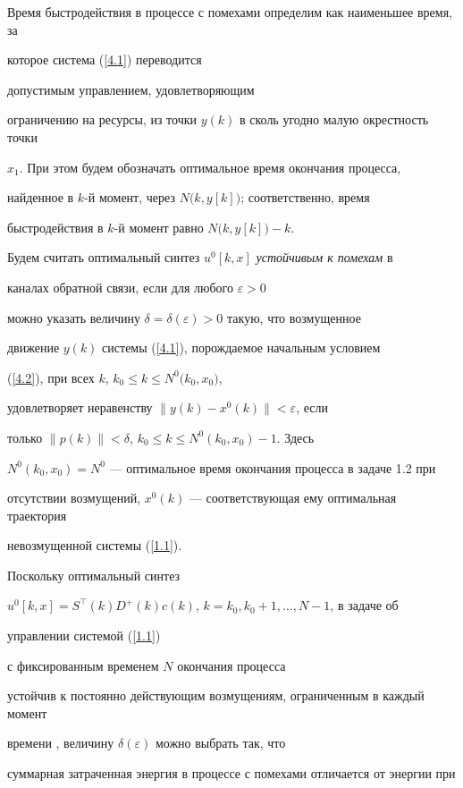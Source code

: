Время быстродействия в процессе с помехами определим как наименьшее время, за


которое система (\ref{4.1}) переводится 


допустимым управлением, удовлетворяющим


ограничению на ресурсы, из точки $y(k)$ в сколь угодно малую окрестность точки


$x_1$. При этом будем обозначать оптимальное время окончания процесса,


найденное в $k$-й момент, через $N\bigl(k, y[k]\bigr)$; соответственно, время


быстродействия в $k$-й момент равно $N\bigl(k, y[k]\bigr)-k$.





Будем считать оптимальный синтез $u^0[k, x]$ {\it устойчивым к помехам} в


каналах обратной связи, если для любого $ \varepsilon>0$


можно указать величину $\delta=\delta(\varepsilon)>0$ такую, что возмущенное


движение $y(k)$ системы (\ref{4.1}), порождаемое начальным условием


(\ref{4.2}), при всех $k$, $k_0\le k \le N^0\bigl(k_0, x_0\bigr)$,


удовлетворяет неравенству $\bigl\|y(k)-x^0(k)\bigr\|<\varepsilon$, если


только $\bigl\|p(k)\bigr\|<\delta$, $k_0\le k \le N^0(k_0, x_0)-1$. Здесь


$N^0(k_0, x_0)=N^0$ --- оптимальное время окончания процесса в задаче 1.2 при


отсутствии возмущений, $x^0(k)$ --- соответствующая ему оптимальная траектория


невозмущенной системы (\ref{1.1}).





Поскольку оптимальный синтез


$u^0[k, x]=S^{\top}(k)D^+(k)c(k)$, $k=k_0, k_0+1,\dotsc, N-1$, в задаче об


управлении системой (\ref{1.1}) 


с фиксированным временем $N$ окончания процесса


устойчив к постоянно действующим возмущениям, ограниченным в каждый момент


времени \cite{2}, величину $\delta(\varepsilon)$ можно выбрать так, что


суммарная затраченная энергия в процессе с помехами отличается от энергии при


